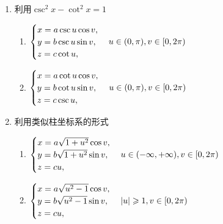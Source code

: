 \begin{solution}
\begin{enumerate}
        \item 利用$\csc^2x-\cot^2x=1$
        \begin{multicols}{2}
              \begin{enumerate}
            \item[单叶] 
            $\begin{cases}
                x=a\csc u\cos v,\\
                y=b\csc u\sin v,\\
                z=c\cot u,\\
            \end{cases}\\u\in(0,\pi),v\in[0,2\pi)$
            \item[双叶] 
            $\begin{cases}
                x=a\cot u\cos v,\\
                y=b\cot u\sin v,\\
                z=c\csc u,\\
            \end{cases}\\u\in(0,\pi),v\in[0,2\pi)$
        \end{enumerate}
        \end{multicols}

        \item 利用类似柱坐标系的形式
        \begin{multicols}{2}
              \begin{enumerate}
            \item[单叶] 
            $\begin{cases}
                x=a\sqrt{1+u^2}\cos v,\\
                y=b\sqrt{1+u^2}\sin v,\\
                z=cu,\\
            \end{cases}\\u\in(-\infty,+\infty),v\in[0,2\pi)$
            \item[双叶] 
            $\begin{cases}
                x=a\sqrt{u^2-1}\cos v,\\
                y=b\sqrt{u^2-1}\sin v,\\
                z=cu,\\
            \end{cases}\\|u|\geqslant 1,v\in[0,2\pi)$
        \end{enumerate}
        \end{multicols}

    \end{enumerate}
\end{solution}

